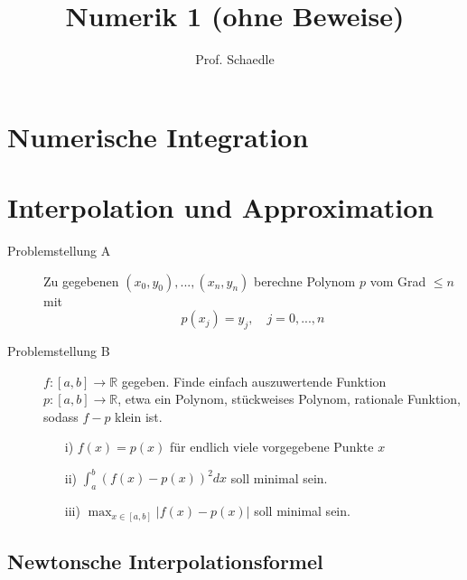 \documentclass[12pt]{article}
\author{Prof. Schaedle}
\title{Numerik 1 (ohne Beweise)}
\theoremstyle{break}
\begin{document}
\maketitle

\newpage

\section{Numerische Integration}


\section{Interpolation und Approximation}

\begin{description}
  \item[Problemstellung A]
    Zu gegebenen $(x_0, y_0), ...,(x_n, y_n)$ berechne Polynom $p$ vom Grad $\leq n$ mit $$p(x_j) = y_j, \quad j=0,...,n$$
  
  \item[Problemstellung B]
    $f:[a,b] \rightarrow \mathbb{R}$ gegeben. Finde einfach auszuwertende Funktion $p: [a,b] \rightarrow \mathbb{R}$, etwa ein Polynom, stückweises Polynom, rationale Funktion, sodass $f-p$ klein ist.
    \begin{enumerate}
      \item[i)] $f(x)=p(x)$ für endlich viele vorgegebene Punkte $x$
      \item[ii)] $\int_a^b (f(x)-p(x))^2 dx$ soll minimal sein.
      \item[iii)] $\max_{x \in [a,b]} \vert f(x) -p(x) \vert$ soll minimal sein.
    \end{enumerate}
\end{description}

\subsection{Newtonsche Interpolationsformel}
\end{document}
